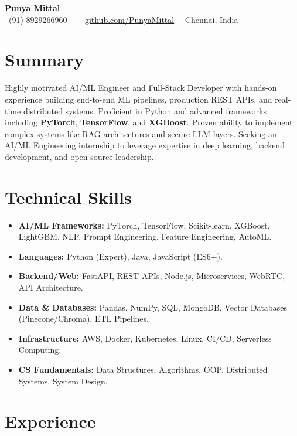 \documentclass[10pt, a4paper]{article}
\makeatletter
\newcommand{\contactinfo}[1]{
    \centering
    \vspace{0.5em}
    \textbf{\Huge #1} \\
    \vspace{0.1em}
    \small \faPhone\ (91) 8929266960 \textbar\ \faEnvelope{punya.m215@gmail.com} \textbar\ \faGithub\ \href{#1}{github.com/PunyaMittal} \textbar\ \faMapMarker\ Chennai, India
    \vspace{0.5em}
}
\makeatother
\begin{document}
\contactinfo{Punya Mittal}

\section*{Summary}
Highly motivated AI/ML Engineer and Full-Stack Developer with hands-on experience building end-to-end ML pipelines, production REST APIs, and real-time distributed systems. Proficient in Python and advanced frameworks including \textbf{PyTorch}, \textbf{TensorFlow}, and \textbf{XGBoost}. Proven ability to implement complex systems like RAG architectures and secure LLM layers. Seeking an AI/ML Engineering internship to leverage expertise in deep learning, backend development, and open-source leadership.

\section*{Technical Skills}
\begin{itemize}[leftmargin=*, itemsep=2pt, parsep=0pt]
    \item \textbf{AI/ML Frameworks:} PyTorch, TensorFlow, Scikit-learn, XGBoost, LightGBM, NLP, Prompt Engineering, Feature Engineering, AutoML.
    \item \textbf{Languages:} Python (Expert), Java, JavaScript (ES6+).
    \item \textbf{Backend/Web:} FastAPI, REST APIs, Node.js, Microservices, WebRTC, API Architecture.
    \item \textbf{Data & Databases:} Pandas, NumPy, SQL, MongoDB, Vector Databases (Pinecone/Chroma), ETL Pipelines.
    \item \textbf{Infrastructure:} AWS, Docker, Kubernetes, Linux, CI/CD, Serverless Computing.
    \item \textbf{CS Fundamentals:} Data Structures, Algorithms, OOP, Distributed Systems, System Design.
\end{itemize}

\section*{Experience}
\end{document}
